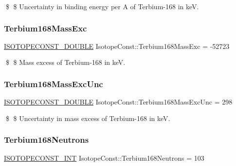 \$ \$ Uncertainty in binding energy per A of Terbium-\/168 in keV. \mbox{\label{group___isotope_const-_terbium-_tb168_ga96fd6788f6524dc7fffa3103a18ac4cf}} 
\subsubsection{\texorpdfstring{Terbium168\+Mass\+Exc}{Terbium168MassExc}}
{\footnotesize\ttfamily \mbox{\hyperlink{group___isotope_const-_macros_ga8f45a7272ce02c0b4c65c44636ed719a}{I\+S\+O\+T\+O\+P\+E\+C\+O\+N\+S\+T\+\_\+\+D\+O\+U\+B\+LE}} Isotope\+Const\+::\+Terbium168\+Mass\+Exc = -\/52723}

\$ \$ Mass excess of Terbium-\/168 in keV. \mbox{\label{group___isotope_const-_terbium-_tb168_ga9d15ef2127c21d7765a4f82a16cbcf69}} 
\subsubsection{\texorpdfstring{Terbium168\+Mass\+Exc\+Unc}{Terbium168MassExcUnc}}
{\footnotesize\ttfamily \mbox{\hyperlink{group___isotope_const-_macros_ga8f45a7272ce02c0b4c65c44636ed719a}{I\+S\+O\+T\+O\+P\+E\+C\+O\+N\+S\+T\+\_\+\+D\+O\+U\+B\+LE}} Isotope\+Const\+::\+Terbium168\+Mass\+Exc\+Unc = 298}

\$ \$ Uncertainty in mass excess of Terbium-\/168 in keV. \mbox{\label{group___isotope_const-_terbium-_tb168_gae8aa35448dca27df708309879481df8a}} 
\subsubsection{\texorpdfstring{Terbium168\+Neutrons}{Terbium168Neutrons}}
{\footnotesize\ttfamily \mbox{\hyperlink{group___isotope_const-_macros_ga5f18360b3e99483a35c32d789e62621c}{I\+S\+O\+T\+O\+P\+E\+C\+O\+N\+S\+T\+\_\+\+I\+NT}} Isotope\+Const\+::\+Terbium168\+Neutrons = 103}

